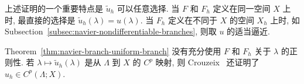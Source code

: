 \setcounter{statement}{1}
\begin{Remark}\label{rem:navier-branch-arbitrary-center}
上述证明的一个重要特点是 $\widetilde u_h$ 可以任意选择. 当 $F$ 和 $F_h$
定义在同一空间 $X$ 上时, 最直接的选择是
$\widetilde u_h(\lambda)=u(\lambda)$. 当 $F_h$ 定义在不同于 $X$ 的空间
$X_h$ 上时, 如 Subsection~\ref{subsec:navier-nondifferentiable-branches},
则取 $u$ 的适当逼近.
\end{Remark}

\setcounter{statement}{2}
\begin{Remark}\label{rem:navier-branch-regularity-in-parameter}
Theorem~\ref{thm:navier-branch-uniform-branch} 没有充分使用 $F$ 和 $F_h$
关于 $\lambda$ 的正则性. 若 $\lambda\mapsto\widetilde u_h(\lambda)$ 是从
$\Lambda$ 到 $X$ 的 $C^p$ 映射, 则 Crouzeix~\cite{CrouzeixForthcoming}
还证明了 $u_h\in C^p(\Lambda;X)$.
\end{Remark}
